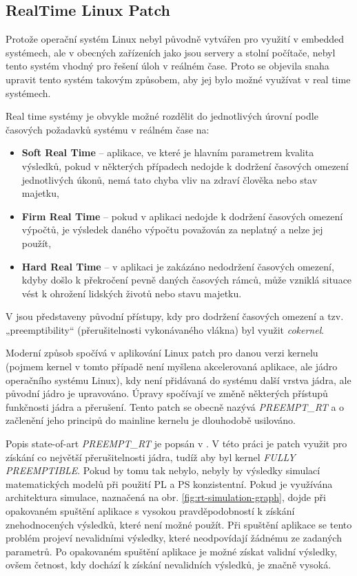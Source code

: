 \documentclass[a4paper, twoside, 11pt]{article}
\begin{document}
		\subsection{RealTime Linux Patch}\label{subsec:real-time-linux-patch}
			Protože operační systém Linux nebyl původně vytvářen pro využití v embedded systémech, ale v obecných zařízeních jako jsou servery a stolní počítače, nebyl tento systém vhodný pro řešení úloh v reálném čase. Proto se objevila snaha upravit tento systém takovým způsobem, aby jej bylo možné využívat v real time systémech.\par
			Real time systémy je obvykle možné rozdělit do jednotlivých úrovní podle časových požadavků systému v reálném čase na:
			\begin{itemize}
				\item \textbf{Soft Real Time} – aplikace, ve které je hlavním parametrem kvalita výsledků, pokud v některých případech nedojde k dodržení časových omezení jednotlivých úkonů, nemá tato chyba vliv na zdraví člověka nebo stav majetku,
				\item \textbf{Firm Real Time} – pokud v aplikaci nedojde k dodržení časových omezení výpočtů, je výsledek daného výpočtu považován za neplatný a nelze jej použít,
				\item \textbf{Hard Real Time} – v aplikaci je zakázáno nedodržení časových omezení, kdyby došlo k překročení pevně daných časových rámců, může vzniklá situace vést k ohrožení lidských životů nebo stavu majetku.
			\end{itemize}
			V \cite{the-real-time-linux-kernel-survey-on-preempt-rt} jsou představeny původní přístupy, kdy pro dodržení časových omezení a tzv. „preemptibility“ (přerušitelnosti vykonávaného vlákna) byl využit \textit{cokernel}.\par
			Moderní způsob spočívá v aplikování Linux patch pro danou verzi kernelu (pojmem kernel v tomto případě není myšlena akcelerovaná aplikace, ale jádro operačního systému Linux), kdy není přidávaná do systému další vrstva jádra, ale původní jádro je upravováno. Úpravy spočívají ve změně některých přístupů funkčnosti jádra a přerušení. Tento patch se obecně nazývá \textit{PREEMPT\_RT} a o začlenění jeho principů do mainline kernelu je dlouhodobě usilováno. \cite{the-real-time-linux-kernel-survey-on-preempt-rt}\par
			Popis state-of-art \textit{PREEMPT\_RT} je popsán v \cite{the-real-time-linux-kernel-survey-on-preempt-rt}. V této práci je patch využit pro získání co největší přerušitelnosti jádra, tudíž aby byl kernel \textit{FULLY PREEMPTIBLE}. Pokud by tomu tak nebylo, nebyly by výsledky simulací matematických modelů při použití PL a PS konzistentní. Pokud je využívána architektura simulace, naznačená na obr. \ref{fig:rt-simulation-graph}, dojde při opakovaném spuštění aplikace s vysokou pravděpodobností k získání znehodnocených výsledků, které není možné použít. Při spuštění aplikace se tento problém projeví nevalidními výsledky, které neodpovídají žádnému ze zadaných parametrů. Po opakovaném spuštění aplikace je možné získat validní výsledky, ovšem četnost, kdy dochází k získání nevalidních výsledků, je značně vysoká.
\end{document}
